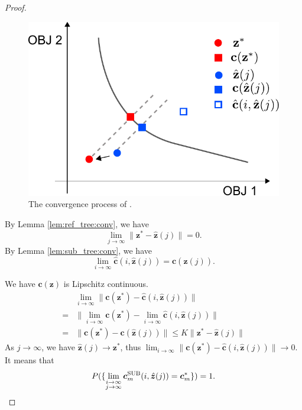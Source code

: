 \documentclass{article}
\begin{document}
\begin{proof}

\begin{figure}
\centering
\includegraphics[width=0.4\linewidth]{fig/conv}
\caption{The convergence process of .}
\label{fig:conv}
\end{figure}

By Lemma \ref{lem:ref_tree:conv}, we have 
\begin{equation}
\lim_{j \to \infty} \lVert \bm{z}^{*} - \hat{\bm{z}} (j) \rVert = 0.
\end{equation}
By Lemma \ref{lem:sub_tree:conv}, we have
\begin{equation}
\lim_{i \to \infty} \hat{\bm{c}}( i, \hat{\bm{z}}(j) ) = \bm{c}( \hat{\bm{z}}(j) ).
\end{equation}


We have $ \bm{c}( \bm{z} ) $ 
is Lipschitz continuous.
\begin{equation}
\begin{aligned}
& \lim_{i \to \infty} \lVert \bm{c}( \bm{z}^{*} ) -  \hat{\bm{c}}( i, \hat{\bm{z}}(j) ) \rVert \\
= & \lVert \lim_{i \to \infty} \bm{c}( \bm{z}^{*} ) - \lim_{i \to \infty} \hat{\bm{c}}( i, \hat{\bm{z}}(j) ) \rVert \\
= & \lVert \bm{c}( \bm{z}^{*} ) - \bm{c}( \hat{\bm{z}}(j) ) \rVert \leq K \lVert \bm{z}^{*} - \hat{\bm{z}}(j) \rVert
\end{aligned}
\end{equation}
As $ j \to \infty $, we have $ \hat{\bm{z}}(j) \to \bm{z}^{*} $, thus $ \lim_{i \to \infty} \lVert \bm{c}( \bm{z}^{*} ) -  \hat{\bm{c}}( i, \hat{\bm{z}}(j) ) \rVert \to 0 $.
It means that 
\begin{equation}
P( \{ \lim_{ \substack{ i \to \infty \\ j \to \infty } } \bm{c}^{\rm SUB}_{m} (i , \hat{\bm{z}} (j) ) =  \bm{c}_{m}^{*}  \} ) = 1 .
\end{equation}
\end{proof}
\end{document}
